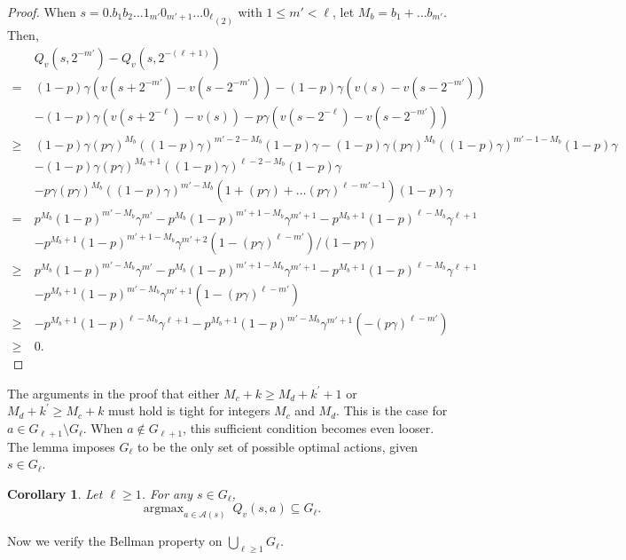 \documentclass{article}
\newtheorem{corollary}[theorem]{Corollary}
\theoremstyle{named}
\DeclareMathOperator*{\argmax}{arg max}
\newcommand{\cA}{\mathcal{A}}
\newcommand{\bracket}[1]{\left(#1\right)}
\begin{document}
\begin{proof}
When $s={0.b_1 b_2 \dots 1_{m'} 0_{m'+1} \dots 0_{\ell}}_{(2)}$ with $1 \le m' < \ell$, let $M_b=b_1+\dots b_{m'}$. Then,
\begin{align*}
& Q_v\bracket{s, 2^{-m'}} - Q_v\bracket{s, 2^{-(\ell+1)}}\\ 
=\ & (1-p)\gamma (v(s+2^{-m'})-v(s-2^{-m'})) - (1-p)\gamma (v(s)-v(s-2^{-m'}))\\
& - (1-p)\gamma (v(s+2^{-\ell})-v(s)) - p\gamma (v(s-2^{-\ell})-v(s-2^{-m'}))\\
\ge\ & (1-p)\gamma(p\gamma)^{M_b}((1-p)\gamma)^{m'-2-M_b}(1-p)\gamma - (1-p)\gamma (p\gamma)^{M_b} ((1-p)\gamma)^{m'-1-M_b}(1-p)\gamma \\
& - (1-p)\gamma (p\gamma)^{M_b+1} ((1-p)\gamma)^{\ell-2-M_b} (1-p)\gamma \\
& - p\gamma (p\gamma)^{M_b}((1-p)\gamma)^{m'-M_b}(1+(p\gamma)+\dots (p\gamma)^{\ell-m'-1})(1-p)\gamma\\
=\ & p^{M_b}(1-p)^{m'-M_b}\gamma^{m'} - p^{M_b}(1-p)^{m'+1-M_b}\gamma^{m'+1} - p^{M_b+1}(1-p)^{\ell-M_b}\gamma^{\ell+1}\\
& - p^{M_b+1}(1-p)^{m'+1-M_b}\gamma^{m'+2}(1-(p\gamma)^{\ell-m'})/(1-p\gamma)\\
\ge\ & p^{M_b}(1-p)^{m'-M_b}\gamma^{m'} - p^{M_b}(1-p)^{m'+1-M_b}\gamma^{m'+1} - p^{M_b+1}(1-p)^{\ell-M_b}\gamma^{\ell+1}\\
& - p^{M_b+1}(1-p)^{m'-M_b}\gamma^{m'+1}(1-(p\gamma)^{\ell-m'})\\
\ge\ & - p^{M_b+1}(1-p)^{\ell-M_b}\gamma^{\ell+1} - p^{M_b+1}(1-p)^{m'-M_b}\gamma^{m'+1}(-(p\gamma)^{\ell-m'})\\
\ge\ & 0. \tag*{\qedhere}
\end{align*}
\end{proof}

The arguments in the proof that either $M_c+k \geq M_d+k^\prime+1$ or $M_d+k^\prime \geq M_c+k$ must hold is tight for integers $M_c$ and $M_d$. This is the case for $a\in G_{\ell+1}\setminus G_\ell$. When $a\notin G_{\ell+1}$, this sufficient condition becomes even looser. The lemma imposes $G_{\ell}$ to be the only set of possible optimal actions, given $s\in G_{\ell}$.

\begin{corollary}
\label{thm:newairrational}
Let $\ell\geq 1$. For any $s\in G_{\ell}$, 
\[\argmax_{a\in \cA(s)}\ Q_v(s,a) \subseteq G_{\ell}.\]
\end{corollary}

Now we verify the Bellman property on $\bigcup_{\ell \ge 1} G_{\ell}$.
\end{document}
